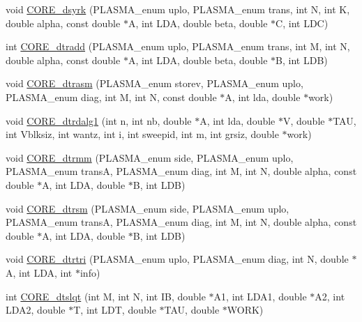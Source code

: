 \begin{DoxyCompactItemize}
\item 
void \hyperlink{group__CORE__double_gae955397a1509aade89dd6c33cbd46d88_gae955397a1509aade89dd6c33cbd46d88}{C\+O\+R\+E\+\_\+dsyrk} (P\+L\+A\+S\+M\+A\+\_\+enum uplo, P\+L\+A\+S\+M\+A\+\_\+enum trans, int N, int K, double alpha, const double $\ast$A, int L\+D\+A, double beta, double $\ast$C, int L\+D\+C)
\item 
int \hyperlink{group__CORE__double_ga36e584eda1f30774893edc6f205705ee_ga36e584eda1f30774893edc6f205705ee}{C\+O\+R\+E\+\_\+dtradd} (P\+L\+A\+S\+M\+A\+\_\+enum uplo, P\+L\+A\+S\+M\+A\+\_\+enum trans, int M, int N, double alpha, const double $\ast$A, int L\+D\+A, double beta, double $\ast$B, int L\+D\+B)
\item 
void \hyperlink{group__CORE__double_gaeda54b92bd167ce4b3b2e9b84e588fd7_gaeda54b92bd167ce4b3b2e9b84e588fd7}{C\+O\+R\+E\+\_\+dtrasm} (P\+L\+A\+S\+M\+A\+\_\+enum storev, P\+L\+A\+S\+M\+A\+\_\+enum uplo, P\+L\+A\+S\+M\+A\+\_\+enum diag, int M, int N, const double $\ast$A, int lda, double $\ast$work)
\item 
void \hyperlink{group__CORE__double_ga5b86142ed209d6ff1ae914d3d2198fe4_ga5b86142ed209d6ff1ae914d3d2198fe4}{C\+O\+R\+E\+\_\+dtrdalg1} (int n, int nb, double $\ast$A, int lda, double $\ast$V, double $\ast$T\+A\+U, int Vblksiz, int wantz, int i, int sweepid, int m, int grsiz, double $\ast$work)
\item 
void \hyperlink{group__CORE__double_gaac031425cb643fc8dd2ca59ae14aa299_gaac031425cb643fc8dd2ca59ae14aa299}{C\+O\+R\+E\+\_\+dtrmm} (P\+L\+A\+S\+M\+A\+\_\+enum side, P\+L\+A\+S\+M\+A\+\_\+enum uplo, P\+L\+A\+S\+M\+A\+\_\+enum trans\+A, P\+L\+A\+S\+M\+A\+\_\+enum diag, int M, int N, double alpha, const double $\ast$A, int L\+D\+A, double $\ast$B, int L\+D\+B)
\item 
void \hyperlink{group__CORE__double_ga01d4724a8dc091661b4fc3049ec04cdd_ga01d4724a8dc091661b4fc3049ec04cdd}{C\+O\+R\+E\+\_\+dtrsm} (P\+L\+A\+S\+M\+A\+\_\+enum side, P\+L\+A\+S\+M\+A\+\_\+enum uplo, P\+L\+A\+S\+M\+A\+\_\+enum trans\+A, P\+L\+A\+S\+M\+A\+\_\+enum diag, int M, int N, double alpha, const double $\ast$A, int L\+D\+A, double $\ast$B, int L\+D\+B)
\item 
void \hyperlink{group__CORE__double_gae38b32f77aa0a15b60c7a4130ca39615_gae38b32f77aa0a15b60c7a4130ca39615}{C\+O\+R\+E\+\_\+dtrtri} (P\+L\+A\+S\+M\+A\+\_\+enum uplo, P\+L\+A\+S\+M\+A\+\_\+enum diag, int N, double $\ast$A, int L\+D\+A, int $\ast$info)
\item 
int \hyperlink{group__CORE__double_ga0cd12ddad904abd1a00df453bc5bb126_ga0cd12ddad904abd1a00df453bc5bb126}{C\+O\+R\+E\+\_\+dtslqt} (int M, int N, int I\+B, double $\ast$A1, int L\+D\+A1, double $\ast$A2, int L\+D\+A2, double $\ast$T, int L\+D\+T, double $\ast$T\+A\+U, double $\ast$W\+O\+R\+K)

\end{DoxyCompactItemize}
